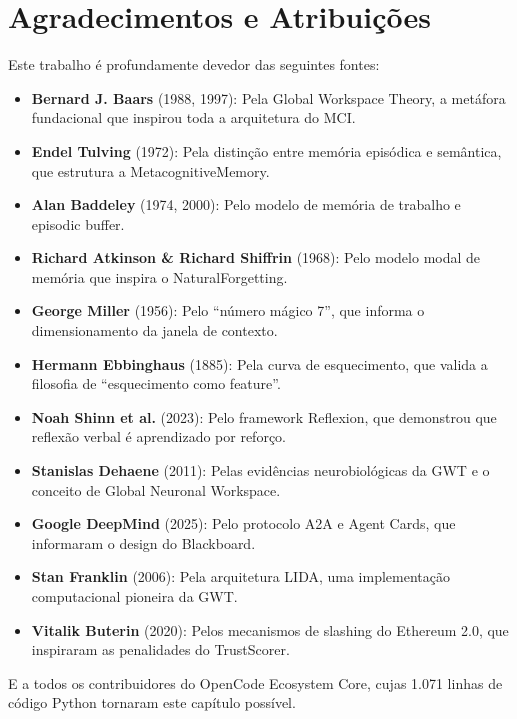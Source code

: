 \section{Agradecimentos e Atribuições}
\label{sec:attributions}

Este trabalho é profundamente devedor das seguintes fontes:

\begin{itemize}
    \item \textbf{Bernard J. Baars} (1988, 1997): Pela Global Workspace Theory, a metáfora fundacional que inspirou toda a arquitetura do MCI.
    \item \textbf{Endel Tulving} (1972): Pela distinção entre memória episódica e semântica, que estrutura a MetacognitiveMemory.
    \item \textbf{Alan Baddeley} (1974, 2000): Pelo modelo de memória de trabalho e episodic buffer.
    \item \textbf{Richard Atkinson \& Richard Shiffrin} (1968): Pelo modelo modal de memória que inspira o NaturalForgetting.
    \item \textbf{George Miller} (1956): Pelo ``número mágico 7'', que informa o dimensionamento da janela de contexto.
    \item \textbf{Hermann Ebbinghaus} (1885): Pela curva de esquecimento, que valida a filosofia de ``esquecimento como feature''.
    \item \textbf{Noah Shinn et al.} (2023): Pelo framework Reflexion, que demonstrou que reflexão verbal é aprendizado por reforço.
    \item \textbf{Stanislas Dehaene} (2011): Pelas evidências neurobiológicas da GWT e o conceito de Global Neuronal Workspace.
    \item \textbf{Google DeepMind} (2025): Pelo protocolo A2A e Agent Cards, que informaram o design do Blackboard.
    \item \textbf{Stan Franklin} (2006): Pela arquitetura LIDA, uma implementação computacional pioneira da GWT.
    \item \textbf{Vitalik Buterin} (2020): Pelos mecanismos de slashing do Ethereum 2.0, que inspiraram as penalidades do TrustScorer.
\end{itemize}

E a todos os contribuidores do OpenCode Ecosystem Core, cujas 1.071 linhas de código Python tornaram este capítulo possível.

